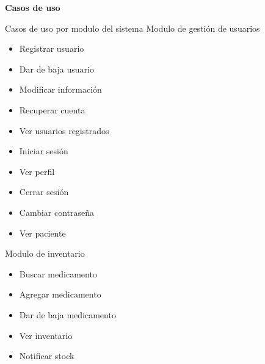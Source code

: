 \documentclass[12pt,letterpaper]{article}
\begin{document}
    \newpage
	\pagestyle{plain}
	{
		\par\vspace{0cm}
		{
			\begin{center}

					\Huge\textbf
					{
						Casos de uso
					}
			\end{center}
		}
                \justify
                Casos de uso por modulo del sistema
                \newline
                \newline
                Modulo de gestión de usuarios
                \begin{itemize}
                    \item Registrar usuario
                    \item Dar de baja usuario
                    \item Modificar información
                    \item Recuperar cuenta
                    \item Ver usuarios registrados
                    \item Iniciar sesión
                    \item Ver perfil
                    \item Cerrar sesión
                    \item Cambiar contraseña
                    \item Ver paciente
                    
                \end{itemize}

                Modulo de inventario
                \begin{itemize}
                    \item Buscar medicamento
                    
                    \item Agregar medicamento
                    
                    \item Dar de baja medicamento
                    
                    \item Ver inventario
                    
                    \item Notificar stock
                    
                \end{itemize}
    }
\end{document}
